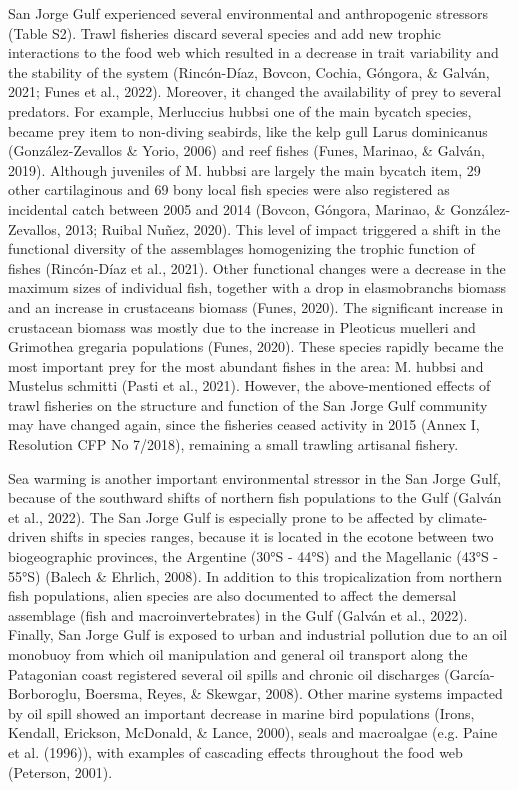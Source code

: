 \documentclass[
]{article}
\begin{document}
San Jorge Gulf experienced several environmental and anthropogenic
stressors (Table S2). Trawl fisheries discard several species and add
new trophic interactions to the food web which resulted in a decrease in
trait variability and the stability of the system (Rincón-Díaz, Bovcon,
Cochia, Góngora, \& Galván, 2021; Funes et al., 2022). Moreover, it
changed the availability of prey to several predators. For example,
Merluccius hubbsi one of the main bycatch species, became prey item to
non-diving seabirds, like the kelp gull Larus dominicanus
(González-Zevallos \& Yorio, 2006) and reef fishes (Funes, Marinao, \&
Galván, 2019). Although juveniles of M. hubbsi are largely the main
bycatch item, 29 other cartilaginous and 69 bony local fish species were
also registered as incidental catch between 2005 and 2014 (Bovcon,
Góngora, Marinao, \& González-Zevallos, 2013; Ruibal Nuñez, 2020). This
level of impact triggered a shift in the functional diversity of the
assemblages homogenizing the trophic function of fishes (Rincón-Díaz et
al., 2021). Other functional changes were a decrease in the maximum
sizes of individual fish, together with a drop in elasmobranchs biomass
and an increase in crustaceans biomass (Funes, 2020). The significant
increase in crustacean biomass was mostly due to the increase in
Pleoticus muelleri and Grimothea gregaria populations (Funes, 2020).
These species rapidly became the most important prey for the most
abundant fishes in the area: M. hubbsi and Mustelus schmitti (Pasti et
al., 2021). However, the above-mentioned effects of trawl fisheries on
the structure and function of the San Jorge Gulf community may have
changed again, since the fisheries ceased activity in 2015 (Annex I,
Resolution CFP No 7/2018), remaining a small trawling artisanal fishery.

Sea warming is another important environmental stressor in the San Jorge
Gulf, because of the southward shifts of northern fish populations to
the Gulf (Galván et al., 2022). The San Jorge Gulf is especially prone
to be affected by climate-driven shifts in species ranges, because it is
located in the ecotone between two biogeographic provinces, the
Argentine (30°S - 44°S) and the Magellanic (43°S - 55°S) (Balech \&
Ehrlich, 2008). In addition to this tropicalization from northern fish
populations, alien species are also documented to affect the demersal
assemblage (fish and macroinvertebrates) in the Gulf (Galván et al.,
2022). Finally, San Jorge Gulf is exposed to urban and industrial
pollution due to an oil monobuoy from which oil manipulation and general
oil transport along the Patagonian coast registered several oil spills
and chronic oil discharges (García-Borboroglu, Boersma, Reyes, \&
Skewgar, 2008). Other marine systems impacted by oil spill showed an
important decrease in marine bird populations (Irons, Kendall, Erickson,
McDonald, \& Lance, 2000), seals and macroalgae (e.g. Paine et al.
(1996)), with examples of cascading effects throughout the food web
(Peterson, 2001).
\end{document}
